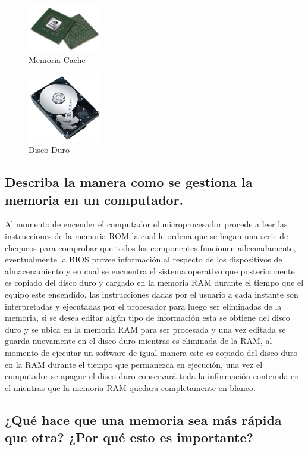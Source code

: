 \documentclass{article}
\begin{document}
\begin{figure}[h]
\includegraphics[width=3.2cm]{Memoria_Cache.jpg}
\centering
\caption{Memoria Cache}
\label{fig:Memoria_Cache}
\end{figure}

\begin{figure}[h]
\includegraphics[width=3.2cm]{Disco_Duro.jpg}
\centering
\caption{Disco Duro}
\label{fig:Disco_Duro}
\end{figure}

\subsection{Describa la manera como se gestiona la memoria en un computador.}

Al momento de encender el computador el microprocesador procede a leer las instrucciones de la memoria ROM la cual le ordena que se hagan una serie de chequeos para comprobar que todos los componentes funcionen adecuadamente, eventualmente la BIOS provee información al respecto de los dispositivos de almacenamiento y en cual se encuentra el sistema operativo que posteriormente es copiado del disco duro y cargado en la memoria RAM durante el tiempo que el equipo este encendido, las  instrucciones dadas por el usuario a cada instante son interpretadas y ejecutadas por el procesador para luego ser eliminadas de la memoria, si se desea editar algún tipo de información esta se obtiene del disco duro y se ubica en la memoria RAM para ser procesada y una vez editada se guarda nuevamente en el disco duro mientras es eliminada de la RAM, al momento de ejecutar un software de igual manera este es copiado del disco duro en la RAM durante el tiempo que permanezca en ejecución, una vez el computador se apague el disco duro conservará toda la información contenida en el mientras que la memoria RAM quedara completamente en blanco.

\subsection{¿Qué hace que una memoria sea más rápida que otra? ¿Por qué esto es importante?}
\end{document}
